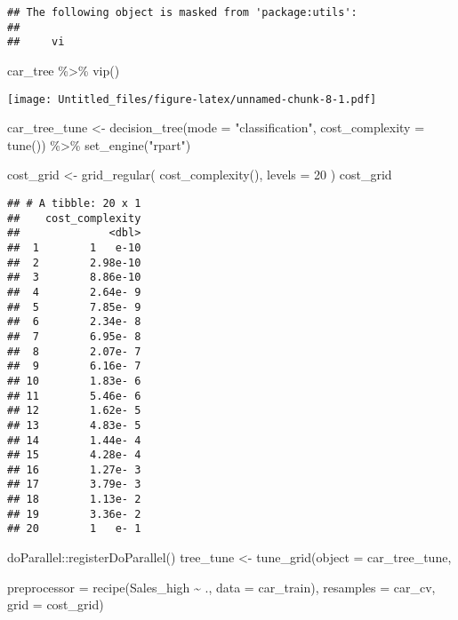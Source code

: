 \documentclass[
]{article}
\newenvironment{Shaded}{\begin{snugshade}}{\end{snugshade}}
\newcommand{\AttributeTok}[1]{\textcolor[rgb]{0.77,0.63,0.00}{#1}}
\newcommand{\DecValTok}[1]{\textcolor[rgb]{0.00,0.00,0.81}{#1}}
\newcommand{\FunctionTok}[1]{\textcolor[rgb]{0.00,0.00,0.00}{#1}}
\newcommand{\NormalTok}[1]{#1}
\newcommand{\OtherTok}[1]{\textcolor[rgb]{0.56,0.35,0.01}{#1}}
\newcommand{\SpecialCharTok}[1]{\textcolor[rgb]{0.00,0.00,0.00}{#1}}
\newcommand{\StringTok}[1]{\textcolor[rgb]{0.31,0.60,0.02}{#1}}
\begin{document}
\begin{verbatim}
## The following object is masked from 'package:utils':
## 
##     vi
\end{verbatim}

\begin{Shaded}
\begin{Highlighting}[]
\NormalTok{car\_tree }\SpecialCharTok{\%\textgreater{}\%} \FunctionTok{vip}\NormalTok{()}
\end{Highlighting}
\end{Shaded}

\texttt{[image: Untitled\_files/figure-latex/unnamed-chunk-8-1.pdf]}

\begin{Shaded}
\begin{Highlighting}[]
\NormalTok{car\_tree\_tune }\OtherTok{\textless{}{-}} \FunctionTok{decision\_tree}\NormalTok{(}\AttributeTok{mode =} \StringTok{"classification"}\NormalTok{, }\AttributeTok{cost\_complexity =} \FunctionTok{tune}\NormalTok{()) }\SpecialCharTok{\%\textgreater{}\%} \FunctionTok{set\_engine}\NormalTok{(}\StringTok{"rpart"}\NormalTok{)}
\end{Highlighting}
\end{Shaded}

\begin{Shaded}
\begin{Highlighting}[]
\NormalTok{cost\_grid }\OtherTok{\textless{}{-}} \FunctionTok{grid\_regular}\NormalTok{( }\FunctionTok{cost\_complexity}\NormalTok{(), }\AttributeTok{levels =} \DecValTok{20}\NormalTok{ ) }
\NormalTok{cost\_grid}
\end{Highlighting}
\end{Shaded}

\begin{verbatim}
## # A tibble: 20 x 1
##    cost_complexity
##              <dbl>
##  1        1   e-10
##  2        2.98e-10
##  3        8.86e-10
##  4        2.64e- 9
##  5        7.85e- 9
##  6        2.34e- 8
##  7        6.95e- 8
##  8        2.07e- 7
##  9        6.16e- 7
## 10        1.83e- 6
## 11        5.46e- 6
## 12        1.62e- 5
## 13        4.83e- 5
## 14        1.44e- 4
## 15        4.28e- 4
## 16        1.27e- 3
## 17        3.79e- 3
## 18        1.13e- 2
## 19        3.36e- 2
## 20        1   e- 1
\end{verbatim}

\begin{Shaded}
\begin{Highlighting}[]
\NormalTok{doParallel}\SpecialCharTok{::}\FunctionTok{registerDoParallel}\NormalTok{()}
\NormalTok{tree\_tune }\OtherTok{\textless{}{-}} \FunctionTok{tune\_grid}\NormalTok{(}\AttributeTok{object =}\NormalTok{ car\_tree\_tune,}

\AttributeTok{preprocessor =} \FunctionTok{recipe}\NormalTok{(Sales\_high }\SpecialCharTok{\textasciitilde{}}\NormalTok{ ., }\AttributeTok{data =}\NormalTok{ car\_train), }\AttributeTok{resamples =}\NormalTok{ car\_cv, }\AttributeTok{grid =}\NormalTok{ cost\_grid)}
\end{Highlighting}
\end{Shaded}
\end{document}
